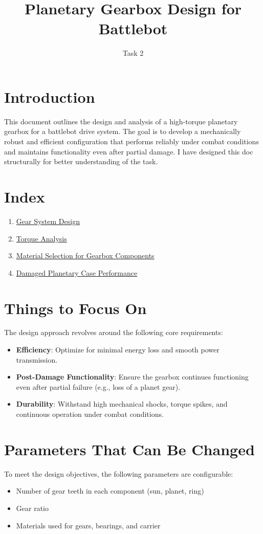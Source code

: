 \documentclass[a4paper,12pt]{article}
\title{Planetary Gearbox Design for Battlebot}
\author{Task 2}
\date{}
\begin{document}
\maketitle

\section*{Introduction}
This document outlines the design and analysis of a high-torque planetary gearbox for a battlebot drive system. The goal is to develop a mechanically robust and efficient configuration that performs reliably under combat conditions and maintains functionality even after partial damage. I have designed this doc structurally for better understanding of the task.

\section*{Index}
\begin{enumerate}
    \item \hyperref[sec:gear]{Gear System Design}
    \item \hyperref[sec:torque]{Torque Analysis}
    \item \hyperref[sec:material]{Material Selection for Gearbox Components}
    \item \hyperref[sec:damage]{Damaged Planetary Case Performance}
\end{enumerate}

\section*{Things to Focus On}
The design approach revolves around the following core requirements:
\begin{itemize}
    \item \textbf{Efficiency}: Optimize for minimal energy loss and smooth power transmission.
    \item \textbf{Post-Damage Functionality}: Ensure the gearbox continues functioning even after partial failure (e.g., loss of a planet gear).
    \item \textbf{Durability}: Withstand high mechanical shocks, torque spikes, and continuous operation under combat conditions.
\end{itemize}

\section*{Parameters That Can Be Changed}
To meet the design objectives, the following parameters are configurable:
\begin{itemize}
    \item Number of gear teeth in each component (sun, planet, ring)
    \item Gear ratio
    \item Materials used for gears, bearings, and carrier
\end{itemize}
\end{document}
